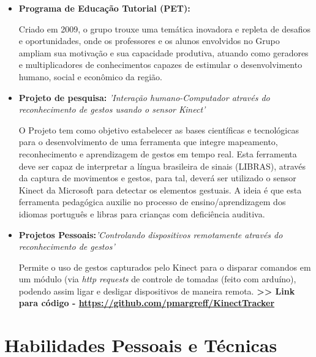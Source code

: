 \documentclass[11pt,a4paper,sans]{moderncv}        %
\begin{document}
\begin{itemize}

\item{\textbf{Programa de Educação Tutorial (PET):} \textit{}

\vspace{3pt}

\small{Criado em 2009, o grupo trouxe uma temática inovadora e repleta de desafios e oportunidades, onde os professores e os alunos envolvidos no Grupo ampliam sua motivação e sua capacidade produtiva, atuando como geradores e multiplicadores de conhecimentos capazes de estimular o desenvolvimento humano, social e econômico da região.}}

\newpage

\item{\textbf{Projeto de pesquisa: } \textit{'Interação humano-Computador através do reconhecimento de gestos usando o sensor Kinect'}

\vspace{3pt}

\small{O Projeto tem como objetivo estabelecer as bases científicas e tecnológicas para o desenvolvimento de uma ferramenta que integre mapeamento, reconhecimento e aprendizagem de gestos em tempo real. Esta ferramenta deve ser capaz de interpretar a língua brasileira de sinais (LIBRAS), através da captura de movimentos e gestos, para tal, deverá ser utilizado o sensor Kinect da Microsoft para detectar os elementos gestuais. A ideia é que esta ferramenta pedagógica auxilie no processo de ensino/aprendizagem dos idiomas português e libras para crianças com deficiência auditiva.}}

\vspace{6pt}

\item{\textbf{Projetos Pessoais:}\textit{'Controlando dispositivos remotamente através do reconhecimento de gestos'}

\vspace{3pt}

\small{Permite o uso de gestos  capturados pelo Kinect para o disparar comandos em um módulo (via \textit{http requests} de controle de tomadas (feito com arduíno), podendo assim ligar e desligar dispositivos de maneira remota.
\textbf{ >> Link para código - \href{https://github.com/pmargreff/KinectTracker}{https://github.com/pmargreff/KinectTracker} }}
}
\end{itemize}
\section{Habilidades Pessoais e Técnicas}
\end{document}
